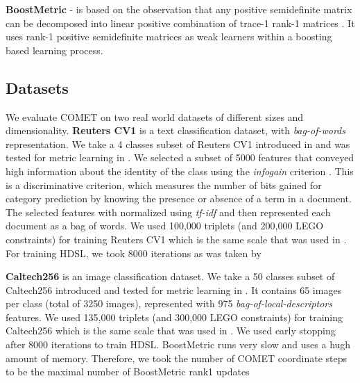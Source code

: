 \documentclass{article}
\begin{document}
{\textbf{BoostMetric} - is based on the observation that any positive semidefinite matrix can be decomposed into linear positive combination of trace-1 rank-1 matrices  \cite{boost}. It uses rank-1 positive semidefinite matrices as weak learners within a boosting based learning process.


\subsection{Datasets}
We evaluate COMET on two real world datasets of different sizes and dimensionality. 
\textbf{Reuters CV1} is a text classification dataset, with \textit{bag-of-words} representation. We take a 4 classes subset of Reuters CV1 introduced in \cite{CaiRCV14} and was tested for metric learning in \cite{hdsl}. We selected a subset of 5000 features that conveyed high information about the identity of the class using the \textit{infogain} criterion \cite{infogain}. This is a discriminative criterion, which measures the number of bits gained for category prediction by knowing the presence or absence of a term in a document. The selected features with normalized using \textit{tf-idf} and then represented each document as a bag of words.  
We used 100,000 triplets (and 200,000 LEGO constraints) for training Reuters CV1 which is the same scale that was used in \cite{hdsl}. For training HDSL, we took 8000 iterations as was taken by \cite{hdsl}

\textbf{Caltech256} is an image classification dataset.   We take a 50 classes subset of Caltech256 introduced and tested for metric learning in \cite{oasis}. It contains 65 images per class (total of 3250 images), represented with 975 \textit{bag-of-local-descriptors} features. We used 135,000 triplets (and 300,000 LEGO constraints) for training Caltech256 which is the same scale that was used in \cite{oasis}. We used early stopping after 8000 iterations to train HDSL. BoostMetric runs very slow and uses a hugh amount of memory. Therefore, we took the number of COMET coordinate steps to be the maximal number of BoostMetric rank1 updates
\ignore{

}
}
\end{document}
